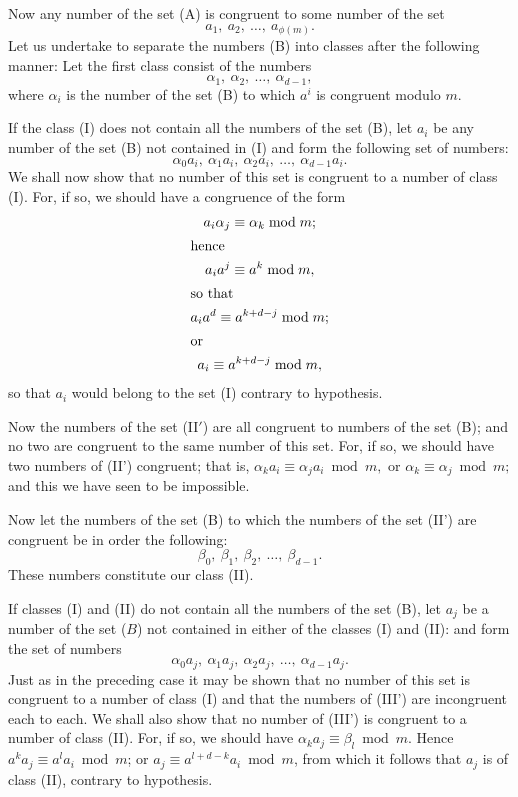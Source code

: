 \documentclass[oneside]{book}
\begin{document}
\smallskip Now any number of the set (A) is congruent to some number
of the set
\begin{equation}
a_1,\ a_2,\ \ldots,\ a_{\phi(m)}. \tag{B}
\end{equation}
Let us undertake to separate the numbers (B) into classes after the
following manner: Let the first class consist of the numbers
\begin{equation}
\alpha_1,\ \alpha_2,\ \ldots,\ \alpha_{d-1}, \tag{I}
\end{equation}
where $\alpha_i$ is the number of the set (B) to which $a^i$ is
congruent modulo $m$.

If the class (I) does not contain all the numbers of the set (B),
let $a_i$ be any number of the set (B) not contained in (I) and form
the following set of numbers:
\begin{equation}
\alpha_0 a_i,\ \alpha_1 a_i,\ \alpha_2 a_i,\ \ldots,\
  \alpha_{d-1}a_i. \tag{II'}
\end{equation}
We shall now show that no number of this set is congruent to a
number of class (I). For, if so, we should have a congruence of the
form
\begin{gather*}
a_i \alpha_j \equiv \alpha_k \bmod m; \\
\intertext{hence}
a_i a^j \equiv a^k \bmod m, \\
\intertext{so that}
a_i a^d \equiv a^{k+d-j} \bmod m; \\
\intertext{or}
a_i \equiv a^{k+d-j} \bmod m,
\end{gather*}
so that $a_i$ would belong to the set (I) contrary to hypothesis.

Now the numbers of the set (II$'$) are all congruent to numbers of
the set (B); and no two are congruent to the same number of this
set. For, if so, we should have two numbers of (II') congruent; that
is, $\alpha_k a_i \equiv \alpha_j a_i \bmod m,$ or $\alpha_k \equiv
\alpha_j \bmod m;$ and this we have seen to be impossible.

Now let the numbers of the set (B) to which the numbers of the set
(II') are congruent be in order the following:
\begin{equation}
\beta_0,\ \beta_1,\ \beta_2,\ \ldots,\ \beta_{d-1}. \tag{II}
\end{equation}
These numbers constitute our class (II).

If classes (I) and (II) do not contain all the numbers of the set
(B), let $a_j$ be a number of the set ($B$) not contained in either
of the classes (I) and (II): and form the set of numbers
\begin{equation}
\alpha_0 a_j,\ \alpha_1 a_j,\ \alpha_2 a_j,\ \ldots,\
   \alpha_{d-1} a_j. \tag{III'}
\end{equation}
Just as in the preceding case it may be shown that no number of this
set is congruent to a number of class (I) and that the numbers of
(III') are incongruent each to each. We shall also show that no
number of (III') is congruent to a number of class (II). For, if so,
we should have $\alpha_k a_j \equiv \beta_l \bmod m$. Hence $a^k a_j
\equiv a^l a_i \bmod m$; or $a_j \equiv a^{l+d-k} a_i \bmod m$, from
which it follows that $a_j$ is of class (II), contrary to
hypothesis.
\end{document}
